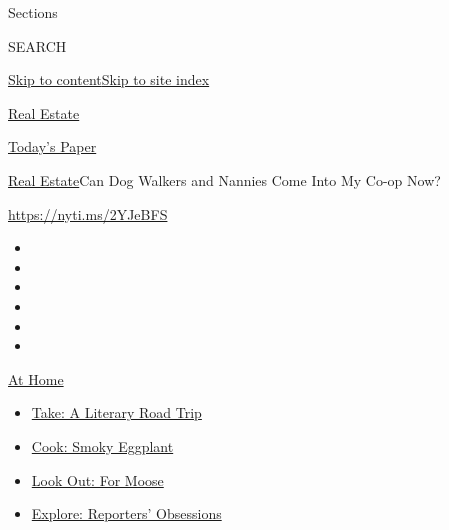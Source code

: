 Sections

SEARCH

\protect\hyperlink{site-content}{Skip to
content}\protect\hyperlink{site-index}{Skip to site index}

\href{https://www.nytimes3xbfgragh.onion/section/realestate}{Real
Estate}

\href{https://myaccount.nytimes3xbfgragh.onion/auth/login?response_type=cookie\&client_id=vi}{}

\href{https://www.nytimes3xbfgragh.onion/section/todayspaper}{Today's
Paper}

\href{/section/realestate}{Real Estate}\textbar{}Can Dog Walkers and
Nannies Come Into My Co-op Now?

\url{https://nyti.ms/2YJeBFS}

\begin{itemize}
\item
\item
\item
\item
\item
\item
\end{itemize}

\href{https://www.nytimes3xbfgragh.onion/spotlight/at-home?action=click\&pgtype=Article\&state=default\&region=TOP_BANNER\&context=at_home_menu}{At
Home}

\begin{itemize}
\tightlist
\item
  \href{https://www.nytimes3xbfgragh.onion/2020/07/28/books/time-for-a-literary-road-trip.html?action=click\&pgtype=Article\&state=default\&region=TOP_BANNER\&context=at_home_menu}{Take:
  A Literary Road Trip}
\item
  \href{https://www.nytimes3xbfgragh.onion/2020/07/29/magazine/bored-with-your-home-cooking-some-smoky-eggplant-will-fix-that.html?action=click\&pgtype=Article\&state=default\&region=TOP_BANNER\&context=at_home_menu}{Cook:
  Smoky Eggplant}
\item
  \href{https://www.nytimes3xbfgragh.onion/2020/07/27/travel/moose-michigan-isle-royale.html?action=click\&pgtype=Article\&state=default\&region=TOP_BANNER\&context=at_home_menu}{Look
  Out: For Moose}
\item
  \href{https://www.nytimes3xbfgragh.onion/interactive/2020/at-home/even-more-reporters-editors-diaries-lists-recommendations.html?action=click\&pgtype=Article\&state=default\&region=TOP_BANNER\&context=at_home_menu}{Explore:
  Reporters' Obsessions}
\end{itemize}

